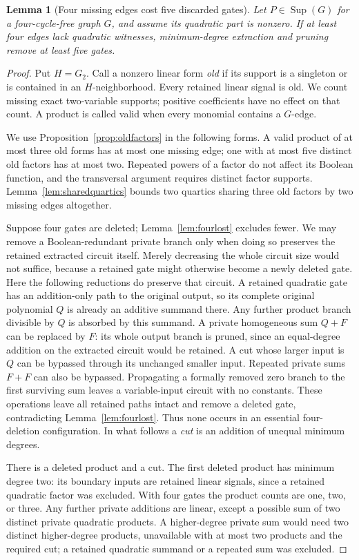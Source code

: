 \documentclass[11pt]{article}
\newcommand{\Sup}{\operatorname{Sup}}
\newtheorem{lemma}[theorem]{Lemma}
\theoremstyle{definition}
\theoremstyle{remark}
\begin{document}
\begin{lemma}[Four missing edges cost five discarded gates]\label{lem:fivelost}
Let $P\in\Sup(G)$ for a four-cycle-free graph $G$, and assume its quadratic part is nonzero. If at least four edges lack quadratic witnesses, minimum-degree extraction and pruning remove at least five gates.
\end{lemma}
\begin{proof}
Put $H=G_2$. Call a nonzero linear form \emph{old} if its support is a singleton or is contained in an $H$-neighborhood. Every retained linear signal is old. We count missing exact two-variable supports; positive coefficients have no effect on that count. A product is called valid when every monomial contains a $G$-edge.

We use Proposition~\ref{prop:oldfactors} in the following forms. A valid product of at most three old forms has at most one missing edge; one with at most five distinct old factors has at most two. Repeated powers of a factor do not affect its Boolean function, and the transversal argument requires distinct factor supports. Lemma~\ref{lem:sharedquartics} bounds two quartics sharing three old factors by two missing edges altogether.

Suppose four gates are deleted; Lemma~\ref{lem:fourlost} excludes fewer. We may remove a Boolean-redundant private branch only when doing so preserves the retained extracted circuit itself. Merely decreasing the whole circuit size would not suffice, because a retained gate might otherwise become a newly deleted gate. Here the following reductions do preserve that circuit. A retained quadratic gate has an addition-only path to the original output, so its complete original polynomial $Q$ is already an additive summand there. Any further product branch divisible by $Q$ is absorbed by this summand. A private homogeneous sum $Q+F$ can be replaced by $F$: its whole output branch is pruned, since an equal-degree addition on the extracted circuit would be retained. A cut whose larger input is $Q$ can be bypassed through its unchanged smaller input. Repeated private sums $F+F$ can also be bypassed. Propagating a formally removed zero branch to the first surviving sum leaves a variable-input circuit with no constants. These operations leave all retained paths intact and remove a deleted gate, contradicting Lemma~\ref{lem:fourlost}. Thus none occurs in an essential four-deletion configuration. In what follows a \emph{cut} is an addition of unequal minimum degrees.

There is a deleted product and a cut. The first deleted product has minimum degree two: its boundary inputs are retained linear signals, since a retained quadratic factor was excluded. With four gates the product counts are one, two, or three. Any further private additions are linear, except a possible sum of two distinct private quadratic products. A higher-degree private sum would need two distinct higher-degree products, unavailable with at most two products and the required cut; a retained quadratic summand or a repeated sum was excluded.


\end{proof}
\end{document}

